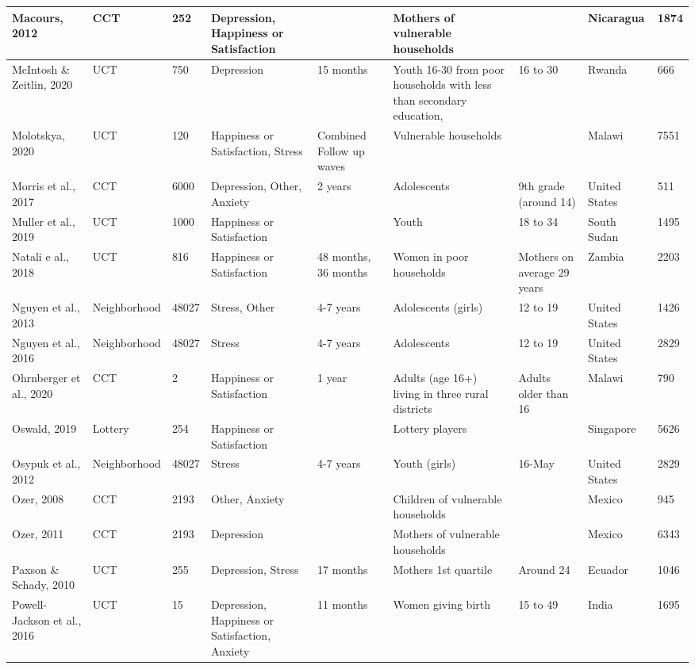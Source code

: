 \begin{table}[ht]
\begin{tabular}{p{1.8cm}p{1.7cm}p{1.3 cm}p{2cm}p{1.7cm}p{2.0cm}p{1cm}p{1.2cm}p{1cm}}
   \hline
Macours, 2012 & CCT & 252 & Depression, Happiness or Satisfaction &  & Mothers of vulnerable households &  & Nicaragua & 1874 \\ 
   \hline
McIntosh \& Zeitlin, 2020 & UCT & 750 & Depression & 15 months & Youth 16-30 from poor households with less than secondary education, & 16 to 30 & Rwanda & 666 \\ 
   \hline
Molotskya, 2020 & UCT & 120 & Happiness or Satisfaction, Stress & Combined Follow up waves & Vulnerable households &  & Malawi & 7551 \\ 
   \hline
Morris et al., 2017 & CCT & 6000 & Depression, Other, Anxiety & 2 years & Adolescents & 9th grade (around 14) & United States & 511 \\ 
   \hline
Muller et al., 2019 & UCT & 1000 & Happiness or Satisfaction &  & Youth & 18 to 34 & South Sudan & 1495 \\ 
   \hline
Natali e al., 2018 & UCT & 816 & Happiness or Satisfaction & 48 months, 36 months & Women in poor households & Mothers on average 29 years & Zambia & 2203 \\ 
   \hline
Nguyen et al., 2013 & Neighborhood & 48027 & Stress, Other & 4-7 years & Adolescents (girls) & 12 to 19 & United States & 1426 \\ 
   \hline
Nguyen et al., 2016 & Neighborhood & 48027 & Stress & 4-7 years & Adolescents & 12 to 19 & United States & 2829 \\ 
   \hline
Ohrnberger et al., 2020 & CCT & 2 & Happiness or Satisfaction & 1 year & Adults (age 16+) living in three rural districts & Adults older than 16 & Malawi & 790 \\ 
   \hline
Oswald, 2019 & Lottery & 254 & Happiness or Satisfaction &  & Lottery players &  & Singapore & 5626 \\ 
   \hline
Osypuk et al., 2012 & Neighborhood & 48027 & Stress & 4-7 years & Youth (girls) & 16-May & United States & 2829 \\ 
   \hline
Ozer, 2008 & CCT & 2193 & Other, Anxiety &  & Children of vulnerable households &  & Mexico & 945 \\ 
   \hline
Ozer, 2011 & CCT & 2193 & Depression &  & Mothers of vulnerable households &  & Mexico & 6343 \\ 
   \hline
Paxson \& Schady, 2010 & UCT & 255 & Depression, Stress & 17 months & Mothers 1st quartile & Around 24 & Ecuador & 1046 \\ 
   \hline
Powell-Jackson et al., 2016 & UCT & 15 & Depression, Happiness or Satisfaction, Anxiety & 11 months & Women giving birth & 15 to 49 & India & 1695 \\ 

\end{tabular}
\end{table}
